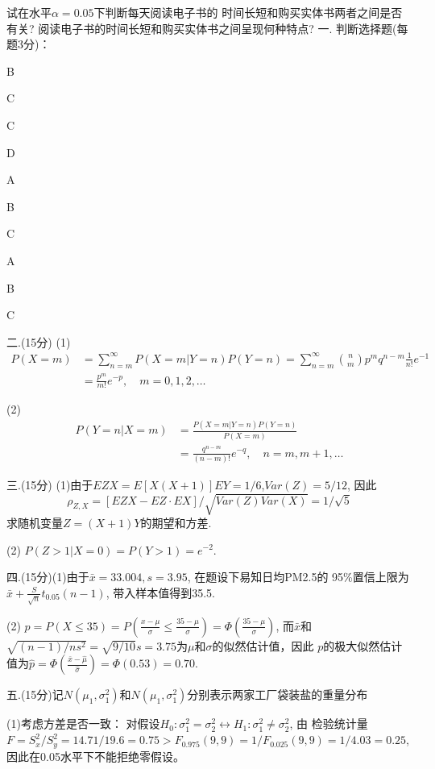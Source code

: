 \documentclass[12pt]{article}
\begin{document}
试在水平$\alpha=0.05$下判断每天阅读电子书的
时间长短和购买实体书两者之间是否有关? 阅读电子书的时间长短和购买实体书之间呈现何种特点?
\newpage
一. 判断选择题(每题3分)：

\begin{inparaenum}
\item B\hfill
\item C\hfill
\item C\hfill
\item D\hfill
\item A\hfill
\item B\hfill
\item C\hfill
\item A\hfill
\item B\hfill
\item C\hfill
\end{inparaenum}

二.(15分)
(1)
\begin{align*}
P(X=m)&=\sum_{n=m}^\infty P(X=m|Y=n)P(Y=n)=\sum_{n=m}^\infty\binom{n}{m}p^mq^{n-m} \frac{1}{n!}e^{-1}\\
&=\frac{p^m}{m!}e^{-p},\quad m=0,1,2,\ldots
\end{align*}

(2)
\begin{align*}
P(Y=n|X=m)&=\frac{P(X=m|Y=n)P(Y=n)}{P(X=m)} \\
&=\frac{q^{n-m}}{(n-m)!}e^{-q},\quad n=m,m+1,\ldots
\end{align*}

三.(15分)
(1)由于$EZX=E[X(X+1)]EY=1/6$,$Var(Z)=5/12$, 因此
$$\rho_{Z,X}=[EZX-EZ\cdot EX]/\sqrt{Var(Z)Var(X)}=1/\sqrt{5}$$
求随机变量$Z=(X+1)Y$的期望和方差.

(2) $P(Z> 1|X=0)=P(Y>1)=e^{-2}$.

四.(15分)(1)由于$\bar{x}=33.004, s=3.95$, 在题设下易知日均PM2.5的 95\%置信上限为$\bar{x}+\frac{S}{\sqrt{n}}t_{0.05}(n-1)$, 带入样本值得到35.5.

(2) $p=P(X\le 35)=P(\frac{x-\mu}{\sigma}\le \frac{35-\mu}{\sigma})=\Phi(\frac{35-\mu}{\sigma})$, 而$\bar{x}$和$\sqrt{(n-1)/ns^2}=\sqrt{9/10}s=3.75$为$\mu$和$\sigma$的似然估计值，因此
 $p$的极大似然估计值为$\hat{p}=\Phi(\frac{\bar{x}-\hat\mu}{\hat\sigma})=\Phi(0.53)=0.70$.

五.(15分)记$N(\mu_1,\sigma_1^2)$和$N(\mu_1,\sigma_1^2)$分别表示两家工厂袋装盐的重量分布

(1)考虑方差是否一致： 对假设$H_0:\sigma_1^2=\sigma_2^2\leftrightarrow H_1:\sigma_1^2\ne\sigma_2^2$, 由
 检验统计量$F=S^2_x/S_y^2=14.71/19.6=0.75> F_{0.975}(9,9)=1/F_{0.025}(9,9)=1/4.03=0.25$, 因此在0.05水平下不能拒绝零假设。
\end{document}
